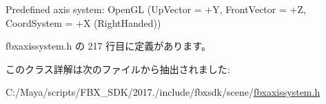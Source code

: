Predefined axis system\+: Open\+GL (Up\+Vector = +Y, Front\+Vector = +Z, Coord\+System = +X (Right\+Handed)) 



 fbxaxissystem.\+h の 217 行目に定義があります。



このクラス詳解は次のファイルから抽出されました\+:\begin{DoxyCompactItemize}
\item 
C\+:/\+Maya/scripts/\+F\+B\+X\+\_\+\+S\+D\+K/2017./include/fbxsdk/scene/\hyperlink{fbxaxissystem_8h}{fbxaxissystem.\+h}\end{DoxyCompactItemize}
